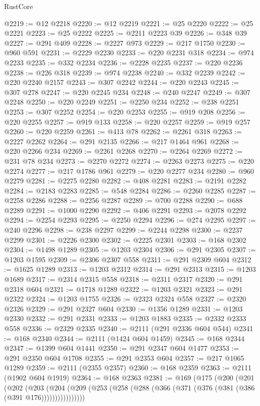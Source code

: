 \begin{lexlean}{RustCore}
\begin{coremodule}
@2219 := @12 @2218
@2220 := @12 @2219
@2221 := @25 @2220
@2222 := @25 @2221
@2223 := @25 @2222
@2225 := @2211 @2223 @39
@2226 := @348 @39
@2227 := @291 @409
@2228 := @2227 @973
@2229 := @217 @1750
@2230 := @960 @591
@2231 := @2229 @2230
@2233 := @220 @2231 @318
@2234 := @974 @2233
@2235 := @332 @2234
@2236 := @2228 @2235
@2237 := @220 @2236
@2238 := @226 @318
@2239 := @974 @2238
@2240 := @332 @2239
@2242 := @220 @2240 @2157
@2243 := @307 @2242
@2244 := @220 @2243
@2245 := @307 @278
@2247 := @220 @2245 @234
@2248 := @240 @2247
@2249 := @307 @2248
@2250 := @220 @2249
@2251 := @2250 @234
@2252 := @238 @2251
@2253 := @307 @2252
@2254 := @220 @2253
@2255 := @919 @208
@2256 := @220 @2255
@2257 := @919 @133
@2258 := @220 @2257
@2259 := @919 @257
@2260 := @220 @2259
@2261 := @413 @78
@2262 := @2261 @318
@2263 := @2227 @2262
@2264 := @291 @2135
@2266 := @217 @1464 @961
@2268 := @220 @2266 @234
@2269 := @2261 @2268
@2270 := @2264 @2269
@2272 := @231 @78 @234
@2273 := @2270 @2272
@2274 := @2263 @2273
@2275 := @220 @2274
@2277 := @217 @1786 @961
@2279 := @220 @2277 @234
@2280 := @960 @2279
@2281 := @2275 @2280
@2282 := @408 @2281
@2283 := @2191 @2282
@2284 := @2183 @2283
@2285 := @548 @2284
@2286 := @2260 @2285
@2287 := @2258 @2286
@2288 := @2256 @2287
@2289 := @700 @2288
@2290 := @688 @2289
@2291 := @1000 @2290
@2292 := @406 @2291
@2293 := @2078 @2292
@2294 := @2254 @2293
@2295 := @2250 @2294
@2296 := @274 @2295
@2297 := @240 @2296
@2298 := @238 @2297
@2299 := @2244 @2298
@2300 := @2237 @2299
@2301 := @2226 @2300
@2302 := @2225 @2301
@2303 := @168 @2302
@2304 := @1498 @1289
@2305 := @1203 @2304
@2306 := @291 @2305
@2307 := @1203 @1595
@2309 := @2306 @2307 @558
@2311 := @291 @2309 @604
@2312 := @1625 @1289
@2313 := @1203 @2312
@2314 := @291 @2313
@2315 := @1203 @1689
@2317 := @2314 @2315 @558
@2318 := @2311 @2317
@2320 := @291 @2318 @604
@2321 := @1718 @1289
@2322 := @1203 @2321
@2323 := @291 @2322
@2324 := @1203 @1755
@2326 := @2323 @2324 @558
@2327 := @2320 @2326
@2329 := @291 @2327 @604
@2330 := @1356 @1289
@2331 := @1203 @2330
@2332 := @291 @2331
@2333 := @1203 @1883
@2335 := @2332 @2333 @558
@2336 := @2329 @2335
@2340 := @2111 (@291 @2336 @604 @544)
@2341 := @168 @2340
@2344 := @2111 (@1424 @604 @1459)
@2345 := @168 @2344
@2347 := @1399 @604 @1441
@2350 := @291 @2347 @604 @1477
@2353 := @291 @2350 @604 @1708
@2355 := @291 @2353 @604
@2357 := @217 @1065 @1289
@2359 := @2111 (@2355 @2357)
@2360 := @168 @2359
@2363 := @2111 (@1902 @604 @1919)
@2364 := @168 @2363
@2381 := @169
    (@175
      (@200
        (@201
          (@202
            (@203
              (@204 (@209 (@253 (@258 (@288 (@366 (@371 (@376 (@381 (@386 (@391 @176))))))))))))))))

\end{coremodule}
\end{lexlean}
